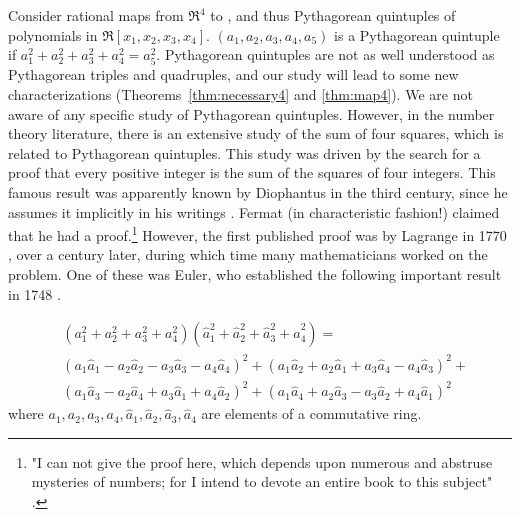 Consider rational maps from $\Re^4$ to , and thus
Pythagorean quintuples of polynomials in \linebreak $\Re[x_1,x_2,x_3,x_4]$.
$(a_1,a_2,a_3,a_4,a_5)$ is a Pythagorean quintuple if
$a_1^2 + a_2^2 + a_3^2 + a_4^2 = a_5^2$.
Pythagorean quintuples are not as well understood as Pythagorean triples
and quadruples, and our study will lead to some new characterizations
(Theorems~\ref{thm:necessary4} and \ref{thm:map4}).
We are not aware of any specific study of Pythagorean quintuples.
However, in the number theory literature, there is an extensive study of the
sum of four squares, which is related to Pythagorean quintuples.
This study was driven by the search for a proof that
every positive integer is the sum of the squares of four integers.
This famous result was apparently known by Diophantus in the third century,
since he assumes it implicitly in his writings \cite{dickson52}. %
Fermat (in characteristic fashion!) claimed that he had a proof.\footnote{"I can
	not give the proof here, which depends upon numerous and abstruse
	mysteries of numbers; for I intend to devote an entire book
	to this subject" \cite[p. 6]{dickson52}.}
However, the first published proof was by Lagrange in 1770 \cite{herstein75}, %
over a century later,
during which time many mathematicians worked on the problem.
One of these was Euler, who established the following important result in 1748
\cite{herstein75}.   %

\begin{lemma}
\[
\begin{array}{ll}
& (a_1^2 + a_2^2 + a_3^2 + a_4^2) 
(\hat{a}^2_1 + \hat{a}^2_2 + \hat{a}^2_3 + \hat{a}^2_4) = \\
& (a_1 \hat{a}_1 - a_2\hat{a}_2 - a_3\hat{a}_3 - a_4\hat{a}_4)^2 +
   (a_1\hat{a}_2 + a_2\hat{a}_1 + a_3\hat{a}_4 - a_4\hat{a}_3)^2 + \\
& (a_1\hat{a}_3 - a_2\hat{a}_4 + a_3\hat{a}_1 + a_4\hat{a}_2)^2 +
   (a_1\hat{a}_4 + a_2\hat{a}_3 - a_3\hat{a}_2 + a_4\hat{a}_1)^2
\end{array}
\]
where $a_1,a_2,a_3,a_4,\hat{a}_1,\hat{a}_2,\hat{a}_3,\hat{a}_4$ are elements of a
commutative ring.
\end{lemma}

